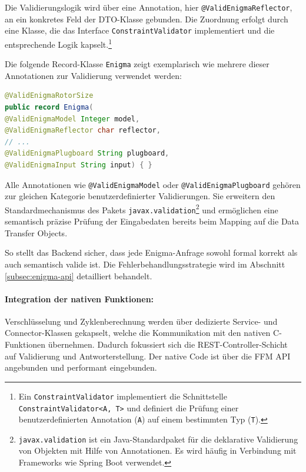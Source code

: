 \documentclass[12pt, ngerman, a4paper, numbers=noenddot]{article}
\begin{document}
Die Validierungslogik wird über eine Annotation, hier \newline\lstinline|@ValidEnigmaReflector|, an ein konkretes Feld der DTO-Klasse gebunden. Die Zuordnung erfolgt durch eine Klasse, die das Interface \lstinline|ConstraintValidator| implementiert und die entsprechende Logik kapselt.\footnote{%
	Ein \lstinline|ConstraintValidator| implementiert die Schnittstelle \newline\lstinline|ConstraintValidator<A, T>| und definiert die Prüfung einer benutzerdefinierten Annotation (\lstinline|A|) auf einem bestimmten Typ (\lstinline|T|).%
}


\newpage
Die folgende Record-Klasse \lstinline|Enigma| zeigt exemplarisch wie mehrere dieser Annotationen zur Validierung verwendet werden:

\begin{lstlisting}[language=Java, caption={DTO-Klasse \lstinline|Enigma| mit Validierungsannotationen}, label=lst:enigma-dto]
@ValidEnigmaRotorSize
public record Enigma(
@ValidEnigmaModel Integer model,
@ValidEnigmaReflector char reflector,
// ...
@ValidEnigmaPlugboard String plugboard,
@ValidEnigmaInput String input) { }
\end{lstlisting}

Alle Annotationen wie \lstinline|@ValidEnigmaModel| oder \lstinline|@ValidEnigmaPlugboard| gehören zur gleichen Kategorie benutzerdefinierter Validierungen. Sie erweitern den Standardmechanismus des Pakets \lstinline|javax.validation|\footnote{%
	\lstinline|javax.validation| ist ein Java-Standardpaket für die deklarative Validierung von Objekten mit Hilfe von Annotationen. Es wird häufig in Verbindung mit Frameworks wie Spring Boot verwendet.%
}
 und ermöglichen eine semantisch präzise Prüfung der Eingabedaten bereits beim Mapping auf die Data Transfer Objects.

So stellt das Backend sicher, dass jede Enigma-Anfrage sowohl formal korrekt als auch semantisch valide ist. Die Fehlerbehandlungsstrategie wird im Abschnitt \ref{subsec:enigma-api} detailliert behandelt.



\paragraph{Integration der nativen Funktionen:}

Verschlüsselung und Zyklenberechnung werden über dedizierte Service- und Connector-Klassen gekapselt, welche die Kommunikation mit den nativen C-Funktionen übernehmen. Dadurch fokussiert sich die REST-Controller-Schicht auf Validierung und Antworterstellung. Der native Code ist über die FFM API angebunden und performant eingebunden.
\end{document}
